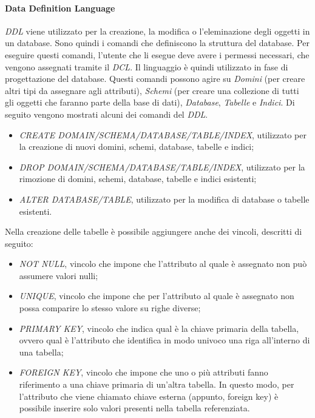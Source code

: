   \paragraph{Data Definition Language}
  \textit{DDL} viene utilizzato per la creazione, la modifica o l'eleminazione degli oggetti in un database. Sono quindi i
  comandi che definiscono la struttura del database. Per eseguire questi comandi, l'utente che li esegue deve avere i permessi
  necessari, che vengono assegnati tramite il \textit{DCL}. Il linguaggio è quindi utilizzato in fase di progettazione del database.
  Questi comandi possono agire su \textit{Domini} (per creare altri tipi da assegnare agli attributi), \textit{Schemi}
  (per creare una collezione di tutti gli oggetti che faranno parte della base di dati), \textit{Database}, \textit{Tabelle}
  e \textit{Indici}. Di seguito vengono mostrati alcuni dei comandi del \textit{DDL}.
  \begin{itemize}
    \item \textit{CREATE DOMAIN/SCHEMA/DATABASE/TABLE/INDEX}, utilizzato per la creazione di nuovi domini, schemi, database,
    tabelle e indici;
    \item \textit{DROP DOMAIN/SCHEMA/DATABASE/TABLE/INDEX}, utilizzato per la rimozione di domini, schemi, database,
    tabelle e indici esistenti;
    \item \textit{ALTER DATABASE/TABLE}, utilizzato per la modifica di database o tabelle esistenti.
  \end{itemize}
  Nella creazione delle tabelle è possibile aggiungere anche dei vincoli, descritti di seguito:
  \begin{itemize}
    \item \textit{NOT NULL}, vincolo che impone che l'attributo al quale è assegnato non può assumere valori nulli;
    \item \textit{UNIQUE}, vincolo che impone che per l'attributo al quale è assegnato non possa comparire lo stesso
    valore su righe diverse;
    \item \textit{PRIMARY KEY}, vincolo che indica qual è la chiave primaria della tabella, ovvero qual è l'attributo
    che identifica in modo univoco una riga all'interno di una tabella;
    \item \textit{FOREIGN KEY}, vincolo che impone che uno o più attributi fanno riferimento a una chiave primaria di
    un'altra tabella. In questo modo, per l'attributo che viene chiamato chiave esterna (appunto, foreign key) è possibile
    inserire solo valori presenti nella tabella referenziata.
  \end{itemize}
  
